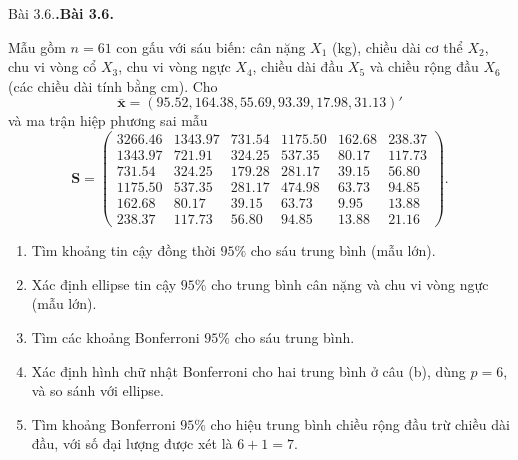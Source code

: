 \documentclass[11pt,a4paper]{article}
\makeatletter
\newcounter{prob}
\newenvironment{problem}[1][]{%
  \par\addvspace{14pt}\noindent\begin{minipage}{\linewidth}
  \def\@tempa{#1}%
  \ifx\@tempa\@empty\refstepcounter{prob}\textbf{\theprob.}\else\textbf{#1}\fi
  \ \ignorespaces
}{\par\end{minipage}\par\nopagebreak[4]}
\makeatother
\begin{document}
\begin{problem}[Bài 3.6.]
Mẫu gồm $n=61$ con gấu với sáu biến: cân nặng $X_1$ (kg), chiều dài cơ thể
$X_2$, chu vi vòng cổ $X_3$, chu vi vòng ngực $X_4$, chiều dài đầu $X_5$
và chiều rộng đầu $X_6$ (các chiều dài tính bằng cm). Cho
\[
\bar{\mathbf{x}}=(95.52,164.38,55.69,93.39,17.98,31.13)'
\]
và ma trận hiệp phương sai mẫu
\[
\mathbf{S}=\begin{pmatrix}
3266.46&1343.97&731.54&1175.50&162.68&238.37\\
1343.97&721.91&324.25&537.35&80.17&117.73\\
731.54&324.25&179.28&281.17&39.15&56.80\\
1175.50&537.35&281.17&474.98&63.73&94.85\\
162.68&80.17&39.15&63.73&9.95&13.88\\
238.37&117.73&56.80&94.85&13.88&21.16
\end{pmatrix}.
\]
\begin{enumerate}[label=(\alph*)]
\item Tìm khoảng tin cậy đồng thời $95\%$ cho sáu trung bình (mẫu lớn).
\item Xác định ellipse tin cậy $95\%$ cho trung bình cân nặng và chu vi vòng ngực
(mẫu lớn).
\item Tìm các khoảng Bonferroni $95\%$ cho sáu trung bình.
\item Xác định hình chữ nhật Bonferroni cho hai trung bình ở câu (b), dùng
$p=6$, và so sánh với ellipse.
\item Tìm khoảng Bonferroni $95\%$ cho hiệu trung bình chiều rộng đầu trừ
chiều dài đầu, với số đại lượng được xét là $6+1=7$.
\end{enumerate}
\end{problem}
\end{document}
